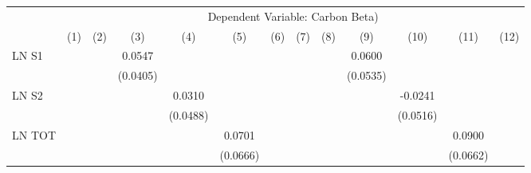 {
\def\sym#1{\ifmmode^{#1}\else\(^{#1}\)\fi}
\begin{tabular}{l*{12}{c}}
\hline\hline
                    &\multicolumn{12}{c}{Dependent Variable: Carbon Beta) }                                                                                                                                                                                                                 \\\cmidrule(lr){2-13}
                    &\multicolumn{1}{c}{(1)}         &\multicolumn{1}{c}{(2)}         &\multicolumn{1}{c}{(3)}         &\multicolumn{1}{c}{(4)}         &\multicolumn{1}{c}{(5)}         &\multicolumn{1}{c}{(6)}         &\multicolumn{1}{c}{(7)}         &\multicolumn{1}{c}{(8)}         &\multicolumn{1}{c}{(9)}         &\multicolumn{1}{c}{(10)}         &\multicolumn{1}{c}{(11)}         &\multicolumn{1}{c}{(12)}         \\
\hline
LN S1               &                     &                     &      0.0547         &                     &                     &                     &                     &                     &      0.0600         &                     &                     &                     \\
                    &                     &                     &    (0.0405)         &                     &                     &                     &                     &                     &    (0.0535)         &                     &                     &                     \\
LN S2               &                     &                     &                     &      0.0310         &                     &                     &                     &                     &                     &     -0.0241         &                     &                     \\
                    &                     &                     &                     &    (0.0488)         &                     &                     &                     &                     &                     &    (0.0516)         &                     &                     \\
LN TOT              &                     &                     &                     &                     &      0.0701         &                     &                     &                     &                     &                     &      0.0900         &                     \\
                    &                     &                     &                     &                     &    (0.0666)         &                     &                     &                     &                     &                     &    (0.0662)         &                     \\

\end{tabular}}
